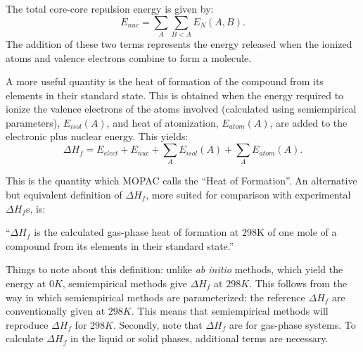 The total core-core repulsion energy is given by:
$$
   E_{nuc} = \sum_A\sum_{B<A}E_N(A,B).
$$
 The addition of these two terms represents the energy
released when the ionized atoms and valence electrons
combine to form a molecule.

 A more useful quantity is the
heat of formation of the compound from its elements in their
standard state. This is obtained when the energy required
to ionize the valence electrons of the atoms involved
(calculated using semiempirical parameters), $E_{isol}(A)$, and
heat of atomization, $E_{atom}(A)$, are added to the electronic
plus nuclear energy. This yields:
$$
\Delta H_f = E_{elect} + E_{nuc} + \sum_AE_{isol}(A) +\sum_AE_{atom}(A).
$$

This is the quantity which MOPAC calls the ``Heat of Formation''.
An alternative but equivalent definition of $\Delta H_f$, more
suited for comparison with experimental $\Delta H_f$s, is:

``$\Delta H_f$ is the calculated gas-phase heat of formation at 298K
 of one mole of a compound from its elements in their standard state.''

Things to note about this definition:  unlike {\em ab initio} methods, which
yield the energy at $0K$, semiempirical methods give $\Delta H_f $
at $298K$.  This follows from the way in which semiempirical methods
are parameterized: the reference $\Delta H_f $ are conventionally given at
$298K$.  This means that  semiempirical methods will reproduce $\Delta H_f$
for $298K$.  Secondly, note that $\Delta H_f $ are for gas-phase systems.
To calculate $\Delta H_f $ in the liquid or solid phases, additional terms are
necessary.
